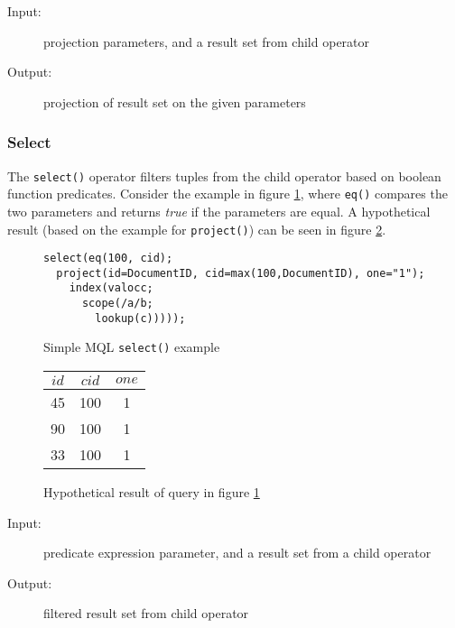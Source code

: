 \begin{description}
  \item[Input:] projection parameters, and a result set from child operator
  \item[Output:] projection of result set on the given parameters
\end{description}

\subsubsection{Select}
The \texttt{select()} operator filters tuples from the child operator based on
boolean function predicates. Consider the example in figure
\ref{figure:mql:select_example}, where \texttt{eq()} compares the two parameters and
returns \textit{true} if the parameters are equal. A hypothetical result (based
on the example for \texttt{project()}) can be seen in figure
\ref{figure:mql:select_example_result}.

\begin{figure}[!h]
\centering
\begin{Verbatim}
select(eq(100, cid);
  project(id=DocumentID, cid=max(100,DocumentID), one="1");
    index(valocc;
      scope(/a/b;
        lookup(c)))));
\end{Verbatim}
\caption{Simple MQL \texttt{select()} example}
\label{figure:mql:select_example}
\end{figure}

\begin{figure}[!h]
\centering
\begin{tabular}{|c | c | c |}
\hline
$id$ & $cid$ & $one$ \\ \hline
45 & 100 & 1 \\ \hline
90 & 100 & 1 \\ \hline
33 & 100 & 1 \\ \hline
\end{tabular}
\caption{Hypothetical result of query in figure
\ref{figure:mql:select_example}}
\label{figure:mql:select_example_result}
\end{figure}

\begin{description}
  \item[Input:] predicate expression parameter, and a result set from a child
operator
  \item[Output:] filtered result set from child operator 
\end{description}

